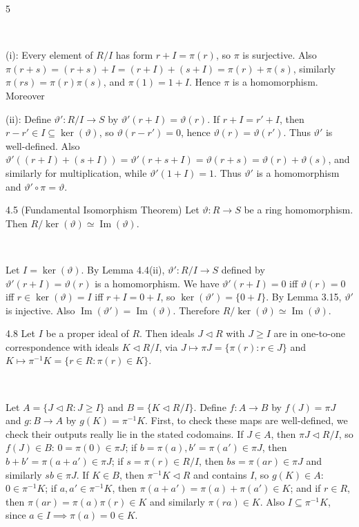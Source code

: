 \documentclass[8pt]{extarticle}
\makeatletter
\newcommand{\fitdisplay}[1]{%
  \par\vspace{-1pt}\noindent
  \sbox{\fitdisplaybox}{#1}%
  \makebox[\columnwidth][c]{%
    \ifdim\wd\fitdisplaybox>\columnwidth
      \resizebox{\columnwidth}{!}{#1}%
    \else
      \usebox{\fitdisplaybox}%
    \fi
  }%
  \par\vspace{-1pt}%
}
\renewenvironment{proof}[1][\proofname]{%
  \par\noindent
  \pushQED{\qed}%
  \normalfont\itshape #1\@addpunct{.}\ \normalfont\ignorespaces
}{%
  \popQED%
  \par
}
\makeatother
\begin{document}
\begin{multicols}{5}
        \begin{proof}
            (i): Every element of \(R/I\) has form \(r+I=\pi(r)\), so \(\pi\) is surjective. Also \(\pi(r+s)=(r+s)+I=(r+I)+(s+I)=\pi(r)+\pi(s)\), similarly \(\pi(rs)=\pi(r)\pi(s)\), and \(\pi(1)=1+I\). Hence \(\pi\) is a homomorphism. Moreover
            \fitdisplay{\(\ker(\pi)=\{r\in R:\pi(r)=0+I\}=\{r\in R:r+I=I\}=I.\)}

            (ii): Define \(\vartheta':R/I\to S\) by \(\vartheta'(r+I)=\vartheta(r)\). If \(r+I=r'+I\), then \(r-r'\in I\subseteq\ker(\vartheta)\), so \(\vartheta(r-r')=0\), hence \(\vartheta(r)=\vartheta(r')\). Thus \(\vartheta'\) is well-defined. Also \(\vartheta'((r+I)+(s+I))=\vartheta'(r+s+I)=\vartheta(r+s)=\vartheta(r)+\vartheta(s)\), and similarly for multiplication, while \(\vartheta'(1+I)=1\). Thus \(\vartheta'\) is a homomorphism and \(\vartheta'\circ\pi=\vartheta\).
        \end{proof}

        \begin{theorem}{4.5}
            (Fundamental Isomorphism Theorem) Let \(\vartheta:R\to S\) be a ring homomorphism. Then \(R/\ker(\vartheta)\simeq\operatorname{Im}(\vartheta)\).
        \end{theorem}

        \begin{proof}
            Let \(I=\ker(\vartheta)\). By Lemma 4.4(ii), \(\vartheta':R/I\to S\) defined by \(\vartheta'(r+I)=\vartheta(r)\) is a homomorphism. We have \(\vartheta'(r+I)=0\) iff \(\vartheta(r)=0\) iff \(r\in\ker(\vartheta)=I\) iff \(r+I=0+I\), so \(\ker(\vartheta')=\{0+I\}\). By Lemma 3.15, \(\vartheta'\) is injective. Also \(\operatorname{Im}(\vartheta')=\operatorname{Im}(\vartheta)\). Therefore \(R/\ker(\vartheta)\simeq\operatorname{Im}(\vartheta)\).
        \end{proof}

        \begin{theorem}{4.8}
            Let \(I\) be a proper ideal of \(R\). Then ideals \(J\lhd R\) with \(J\ge I\) are in one-to-one correspondence with ideals \(K\lhd R/I\), via \(J\mapsto\pi J=\{\pi(r):r\in J\}\) and \(K\mapsto\pi^{-1}K=\{r\in R:\pi(r)\in K\}\).
        \end{theorem}

        \begin{proof}
            Let \(A=\{J\lhd R:J\ge I\}\) and \(B=\{K\lhd R/I\}\). Define \(f:A\to B\) by \(f(J)=\pi J\) and \(g:B\to A\) by \(g(K)=\pi^{-1}K\). First, to check these maps are well-defined, we check their outputs really lie in the stated codomains. If \(J\in A\), then \(\pi J\lhd R/I\), so \(f(J)\in B\): \(0=\pi(0)\in\pi J\); if \(b=\pi(a),b'=\pi(a')\in\pi J\), then \(b+b'=\pi(a+a')\in\pi J\); if \(s=\pi(r)\in R/I\), then \(bs=\pi(ar)\in\pi J\) and similarly \(sb\in\pi J\). If \(K\in B\), then \(\pi^{-1}K\lhd R\) and contains \(I\), so \(g(K)\in A\): \(0\in\pi^{-1}K\); if \(a,a'\in\pi^{-1}K\), then \(\pi(a+a')=\pi(a)+\pi(a')\in K\); and if \(r\in R\), then \(\pi(ar)=\pi(a)\pi(r)\in K\) and similarly \(\pi(ra)\in K\). Also \(I\subseteq\pi^{-1}K\), since \(a\in I\implies\pi(a)=0\in K\).


\end{proof}
\end{multicols}
\end{document}
